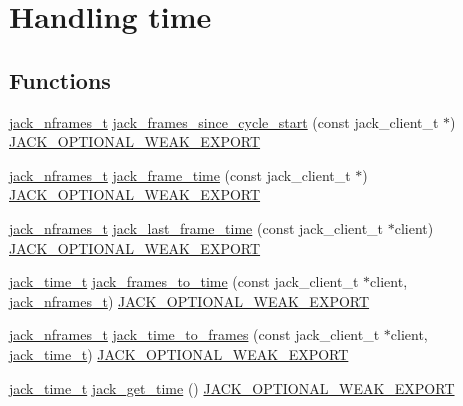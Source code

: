 \hypertarget{group__TimeFunctions}{\section{\-Handling time}
\label{d8/dcd/group__TimeFunctions}
}
\subsection*{\-Functions}
\begin{DoxyCompactItemize}
\item 
\hyperlink{types_8h_aa954df532e901ae5172e68a23f3da9b6}{jack\-\_\-nframes\-\_\-t} \hyperlink{group__TimeFunctions_gad52dc447fd9027922d466f695e697660}{jack\-\_\-frames\-\_\-since\-\_\-cycle\-\_\-start} (const jack\-\_\-client\-\_\-t $\ast$) \hyperlink{weakmacros_8h_adf1bde0dd996bbf61a44311165014dd1}{\-J\-A\-C\-K\-\_\-\-O\-P\-T\-I\-O\-N\-A\-L\-\_\-\-W\-E\-A\-K\-\_\-\-E\-X\-P\-O\-R\-T}
\item 
\hyperlink{types_8h_aa954df532e901ae5172e68a23f3da9b6}{jack\-\_\-nframes\-\_\-t} \hyperlink{group__TimeFunctions_ga45cec2e76db58e72b46339229de64697}{jack\-\_\-frame\-\_\-time} (const jack\-\_\-client\-\_\-t $\ast$) \hyperlink{weakmacros_8h_adf1bde0dd996bbf61a44311165014dd1}{\-J\-A\-C\-K\-\_\-\-O\-P\-T\-I\-O\-N\-A\-L\-\_\-\-W\-E\-A\-K\-\_\-\-E\-X\-P\-O\-R\-T}
\item 
\hyperlink{types_8h_aa954df532e901ae5172e68a23f3da9b6}{jack\-\_\-nframes\-\_\-t} \hyperlink{group__TimeFunctions_gae09e1c61ff0c43d4daea6cf480b7b915}{jack\-\_\-last\-\_\-frame\-\_\-time} (const jack\-\_\-client\-\_\-t $\ast$client) \hyperlink{weakmacros_8h_adf1bde0dd996bbf61a44311165014dd1}{\-J\-A\-C\-K\-\_\-\-O\-P\-T\-I\-O\-N\-A\-L\-\_\-\-W\-E\-A\-K\-\_\-\-E\-X\-P\-O\-R\-T}
\item 
\hyperlink{types_8h_af9a29b8728e95cc38e2932c0ef855b7e}{jack\-\_\-time\-\_\-t} \hyperlink{group__TimeFunctions_ga9338f5b4866b3e749647d9c4b41c23b6}{jack\-\_\-frames\-\_\-to\-\_\-time} (const jack\-\_\-client\-\_\-t $\ast$client, \hyperlink{types_8h_aa954df532e901ae5172e68a23f3da9b6}{jack\-\_\-nframes\-\_\-t}) \hyperlink{weakmacros_8h_adf1bde0dd996bbf61a44311165014dd1}{\-J\-A\-C\-K\-\_\-\-O\-P\-T\-I\-O\-N\-A\-L\-\_\-\-W\-E\-A\-K\-\_\-\-E\-X\-P\-O\-R\-T}
\item 
\hyperlink{types_8h_aa954df532e901ae5172e68a23f3da9b6}{jack\-\_\-nframes\-\_\-t} \hyperlink{group__TimeFunctions_ga968ec852b3a33127425fbc479c99f14e}{jack\-\_\-time\-\_\-to\-\_\-frames} (const jack\-\_\-client\-\_\-t $\ast$client, \hyperlink{types_8h_af9a29b8728e95cc38e2932c0ef855b7e}{jack\-\_\-time\-\_\-t}) \hyperlink{weakmacros_8h_adf1bde0dd996bbf61a44311165014dd1}{\-J\-A\-C\-K\-\_\-\-O\-P\-T\-I\-O\-N\-A\-L\-\_\-\-W\-E\-A\-K\-\_\-\-E\-X\-P\-O\-R\-T}
\item 
\hyperlink{types_8h_af9a29b8728e95cc38e2932c0ef855b7e}{jack\-\_\-time\-\_\-t} \hyperlink{group__TimeFunctions_ga7cdc1d48f51bab3e88317b774b3b4193}{jack\-\_\-get\-\_\-time} () \hyperlink{weakmacros_8h_adf1bde0dd996bbf61a44311165014dd1}{\-J\-A\-C\-K\-\_\-\-O\-P\-T\-I\-O\-N\-A\-L\-\_\-\-W\-E\-A\-K\-\_\-\-E\-X\-P\-O\-R\-T}
\end{DoxyCompactItemize}



